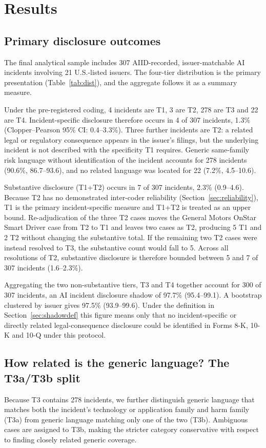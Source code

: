 \documentclass[utf8]{FrontiersinHarvard}
\begin{document}
\section{Results}

\subsection{Primary disclosure outcomes}\label{sec:primary}
The final analytical sample includes 307 AIID-recorded, issuer-matchable AI incidents involving 21 U.S.-listed issuers. The four-tier distribution is the primary presentation (Table~\ref{tab:dist}), and the aggregate follows it as a summary measure.

Under the pre-registered coding, 4 incidents are T1, 3 are T2, 278 are T3 and 22 are T4. Incident-specific disclosure therefore occurs in 4 of 307 incidents, 1.3\% (Clopper--Pearson 95\% CI: 0.4--3.3\%). Three further incidents are T2: a related legal or regulatory consequence appears in the issuer's filings, but the underlying incident is not described with the specificity T1 requires. Generic same-family risk language without identification of the incident accounts for 278 incidents (90.6\%, 86.7--93.6), and no related language was located for 22 (7.2\%, 4.5--10.6).

Substantive disclosure (T1+T2) occurs in 7 of 307 incidents, 2.3\% (0.9--4.6). Because T2 has no demonstrated inter-coder reliability (Section~\ref{sec:reliability}), T1 is the primary incident-specific measure and T1+T2 is treated as an upper bound. Re-adjudication of the three T2 cases moves the General Motors OnStar Smart Driver case from T2 to T1 and leaves two cases as T2, producing 5 T1 and 2 T2 without changing the substantive total. If the remaining two T2 cases were instead resolved to T3, the substantive count would fall to 5. Across all resolutions of T2, substantive disclosure is therefore bounded between 5 and 7 of 307 incidents (1.6--2.3\%).

Aggregating the two non-substantive tiers, T3 and T4 together account for 300 of 307 incidents, an AI incident disclosure shadow of 97.7\% (95.4--99.1). A bootstrap clustered by issuer gives 97.5\% (93.9--99.6). Under the definition in Section~\ref{sec:shadowdef} this figure means only that no incident-specific or directly related legal-consequence disclosure could be identified in Forms 8-K, 10-K and 10-Q under this protocol.

\subsection{How related is the generic language? The T3a/T3b split}\label{sec:t3split}
Because T3 contains 278 incidents, we further distinguish generic language that matches both the incident's technology or application family and harm family (T3a) from generic language matching only one of the two (T3b). Ambiguous cases are assigned to T3b, making the stricter category conservative with respect to finding closely related generic coverage.
\end{document}
